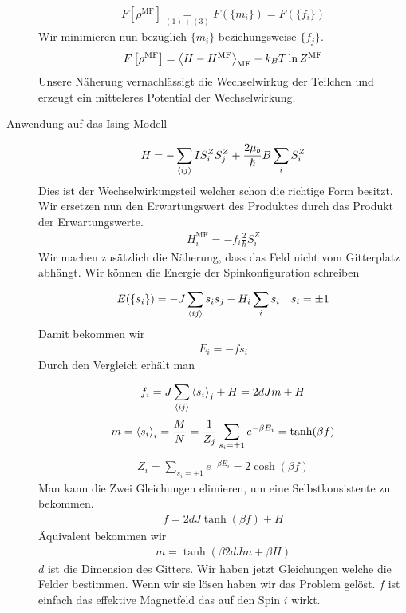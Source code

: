 \begin{description}
    \begin{align*}
      F[\rho^\text{MF}] \underset{(1)+(3)}{=}  F \left( \{m_i\} \right) = 
      F(\{f_i\})
    \end{align*}
    Wir minimieren nun bezüglich $\{m_i\}$ beziehungsweise $\{f_j\}$.
    \begin{align*}
      F\left[ \rho^\text{MF} \right] = \Braket{ H - H^\text{MF}}_\text{MF}
      - k_B T \ln{Z^\text{MF}}
    \end{align*}
    Unsere Näherung vernachlässigt die Wechselwirkug der Teilchen und erzeugt
    ein mitteleres Potential der Wechselwirkung.
  \item[Anwendung auf das Ising-Modell] 
    \begin{align*}
      H = - \sum_{\Braket{ij}}^{} I S_i^Z S_j^Z + \frac{2 \mu_b}{\hbar} B \sum_{i}^{}S_i^Z
    \end{align*}
    Dies ist der Wechselwirkungsteil welcher schon die richtige Form besitzt.
    Wir ersetzen nun den Erwartungswert des Produktes durch das Produkt der 
    Erwartungswerte.
    \begin{align*}
      H_i^\text{MF} = - f_i \frac{2}{\hbar} S_i^Z
    \end{align*}
    Wir machen zusätzlich die Näherung, dass das Feld nicht vom Gitterplatz abhängt.
    Wir können die Energie der Spinkonfiguration schreiben
    \begin{align*}
      E(\{s_i\}) = - J \sum_{\Braket{ij}}^{} s_i s_j - H_i \sum_{i}^{} s_i && s_i = \pm 1
    \end{align*}
    Damit bekommen wir 
    \begin{align*}
      E_i = - f s_i
    \end{align*}
    Durch den Vergleich erhält man
    \begin{align*}
      f_i = J \sum_{\Braket{ij}}^{} \Braket{s_i}_j + H = 2 d J m + H
    \end{align*}
    \begin{align*}
      m = \Braket{s_i}_i = \frac{M}{N} = \frac{1}{Z_j} \sum_{s_i = \pm 1}^{} e^{-\beta E_i} = \tanh(\beta f)
    \end{align*}
    \begin{align*}
      Z_i = \sum_{s_i = \pm 1}^{} e^{-\beta E_i} = 2 \cosh\left( \beta f \right)
    \end{align*}
    Man kann die Zwei Gleichungen elimieren, um eine Selbstkonsistente zu bekommen.
    \begin{align*}
      f= 2 d J \tanh(\beta f) + H
    \end{align*}
    Äquivalent bekommen wir
    \begin{align*}
      m = \tanh(\beta 2 d J m + \beta H)
    \end{align*}
    $d$ ist die Dimension des Gitters.
    Wir haben jetzt Gleichungen welche die Felder bestimmen. Wenn wir sie lösen
    haben wir das Problem gelöst. $f$ ist einfach das effektive Magnetfeld das
    auf den Spin $i$ wirkt. 


\end{description}
